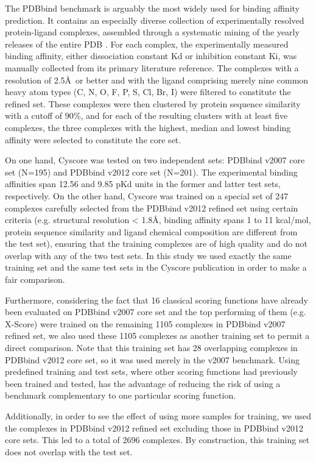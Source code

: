 \documentclass[journal=jacsat,manuscript=article]{achemso}
\begin{document}
The PDBbind benchmark is arguably the most widely used for binding affinity prediction. It contains an especially diverse collection of experimentally resolved protein-ligand complexes, assembled through a systematic mining of the yearly releases of the entire PDB \cite{540,537}. For each complex, the experimentally measured binding affinity, either dissociation constant Kd or inhibition constant Ki, was manually collected from its primary literature reference. The complexes with a resolution of 2.5\AA\ or better and with the ligand comprising merely nine common heavy atom types (C, N, O, F, P, S, Cl, Br, I) were filtered to constitute the refined set. These complexes were then clustered by protein sequence similarity with a cutoff of 90\%, and for each of the resulting clusters with at least five complexes, the three complexes with the highest, median and lowest binding affinity were selected to constitute the core set.

On one hand, Cyscore was tested on two independent sets: PDBbind v2007 core set (N=195) and PDBbind v2012 core set (N=201). The experimental binding affinities span 12.56 and 9.85 pKd units in the former and latter test sets, respectively. On the other hand, Cyscore was trained on a special set of 247 complexes carefully selected from the PDBbind v2012 refined set using certain criteria \cite{1372} (e.g. structural resolution < 1.8\AA, binding affinity spans 1 to 11 kcal/mol, protein sequence similarity and ligand chemical composition are different from the test set), ensuring that the training complexes are of high quality and do not overlap with any of the two test sets. In this study we used exactly the same training set and the same test sets in the Cyscore publication in order to make a fair comparison.

Furthermore, considering the fact that 16 classical scoring functions have already been evaluated \cite{1313} on PDBbind v2007 core set and the top performing of them (e.g. X-Score) were trained on the remaining 1105 complexes in PDBbind v2007 refined set, we also used these 1105 complexes as another training set to permit a direct comparison. Note that this training set has 28 overlapping complexes in PDBbind v2012 core set, so it was used merely in the v2007 benchmark. Using predefined training and test sets, where other scoring functions had previously been trained and tested, has the advantage of reducing the risk of using a benchmark complementary to one particular scoring function.

Additionally, in order to see the effect of using more samples for training, we used the complexes in PDBbind v2012 refined set excluding those in PDBbind v2012 core sets. This led to a total of 2696 complexes. By construction, this training set does not overlap with the test set. %
\end{document}
